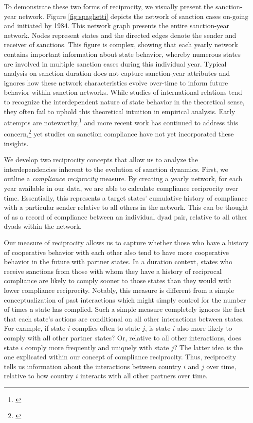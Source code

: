 To demonstrate these two forms of reciprocity, we visually present the sanction-year network. Figure \ref{fig:spaghetti} depicts the network of sanction cases on-going and initiated by 1984. This network graph presents the entire sanction-year network.  Nodes represent states and the directed edges denote the sender and receiver of sanctions. This figure is complex, showing that each yearly network contains important information about state behavior, whereby numerous states are involved in multiple sanction cases during this individual year. Typical analysis on sanction duration does not capture sanction-year attributes and ignores how these network characteristics evolve over-time to inform future behavior within sanction networks. While studies of international relations tend to recognize the interdependent nature of state behavior in the theoretical sense, they often fail to uphold this theoretical intuition in empirical analysis. Early attempts are noteworthy,\footnote{\cite{keohane1989reciprocity,goldstein1991reciprocity}} and more recent work has continued to address this concern,\footnote{\cite{mitchell2001,cranmer2014reciprocity}} yet studies on sanction compliance have not yet incorporated these insights. 

We develop two reciprocity concepts that allow us to analyze the interdependencies inherent to the evolution of sanction dynamics. First, we outline a \textit{compliance reciprocity} measure. By creating a yearly network, for each year available in our data, we are able to calculate compliance reciprocity over time. Essentially, this represents a target states' cumulative history of compliance with a particular sender relative to all others in the network. This can be thought of as a record of compliance between an individual dyad pair, relative to all other dyads within the network. 

 Our measure of reciprocity allows us to capture whether those who have a history of cooperative behavior with each other also tend to have more cooperative behavior in the future with partner states. In a duration context, states who receive sanctions from those with whom they have a history of reciprocal compliance are likely to comply sooner to those states than they would with lower compliance reciprocity. Notably, this measure is different from a simple conceptualization of past interactions which might simply control for the number of times a state has complied. Such a simple measure completely ignores the fact that each state's actions are conditional on all other interactions between states. For example, if state $i$ complies often to state $j$, is state $i$ also more likely to comply with all other partner states? Or, relative to all other interactions, does state $i$ comply more frequently and uniquely with state $j$? The latter idea is the one explicated within our  concept of compliance reciprocity. Thus, reciprocity tells us information about the interactions between country $i$ and $j$ over time, relative to how country $i$ interacts with all other partners over time. 

